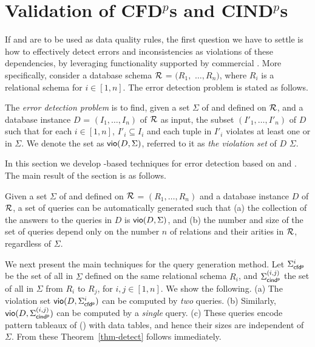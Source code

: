 \section{Validation of CFD$^p$s and CIND$^p$s}
\label{sec-detect}

If \pCFDs and \pCINDs are to be used as data quality rules, the
first question we have to settle is how to effectively detect errors
and inconsistencies as violations of these dependencies, by
leveraging functionality supported by commercial \rdms. More
specifically, consider a database schema ${\cal R}$ = $(R_1,$
$\dots,R_n)$, where $R_i$ is a relational schema for $i \in [1, n]$.
The error detection problem is stated as follows.


The {\em error detection problem} is to find, given a  set $\Sigma$
of \pCFDs and \pCINDs defined on $\R$, and a database instance $D$ =
$(I_1,\dots,I_n)$ of ${\cal R}$ as input, the subset
$(I'_1,\dots,I'_n)$ of $D$ such that for each $i\in[1,n]$,
$I'_i\subseteq I_i$ and
 each tuple in $I'_i$ violates at least one  \pCFD or
\pCIND in $\Sigma$. We denote the set as ${\mathsf{vio}}(D, \Sigma)$,
referred to it as {\em the violation set} of $D$ \wrt $\Sigma$.

In this section we develop \SQL-based techniques for error detection
based on \pCFDs and \pCINDs. The main result of the section is
as follows.

\begin{theorem}
\label{thm-detect} Given a set $\Sigma$  of \pCFDs and \pCINDs
defined on $\R$ = $(R_1,\dots, R_n)$ and a database instance $D$ of ${\cal R}$, a set of \SQL queries can be
automatically generated such that (a) the collection of the answers
to the \SQL queries in $D$ is ${\mathsf{vio}}(D,\Sigma)$, and (b) the number
and size of the set of \SQL queries depend only on the number $n$ of
relations and their arities in $\R$, regardless of $\Sigma$.
\end{theorem}

We next present the main techniques for the query generation
method. Let $\Sigma_{{\mathsf{cfd^p}}}^i$ be the set of all \pCFDs in $\Sigma$
defined on the same relational schema $R_i$, and $\Sigma_{{\mathsf{cind^p}}}^{(i,j)}$ the
set of all \pCINDs in $\Sigma$ from $R_i$ to $R_j$, for
$i, j \in [1, n]$. We show the following. (a) The violation
set ${\mathsf{vio}}(D, \Sigma_{{\mathsf{cfd^p}}}^i)$ can be computed by {\em two}
\SQL queries. (b) Similarly,  ${\mathsf{vio}}(D, \Sigma_{{\mathsf{cind^p}}}^{(i,j)})$
can be computed by a {\em single} \SQL query.
(c) These \SQL queries encode pattern tableaux
of \pCFDs (\pCINDs) with data tables, and hence
their sizes are independent of $\Sigma$. {From}
these Theorem~\ref{thm-detect} follows immediately.


